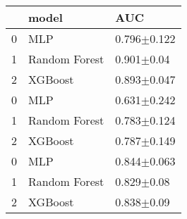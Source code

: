 \begin{tabular}{lll}
\toprule
 & model & AUC \\
\midrule
0 & MLP & 0.796$\pm$0.122 \\
1 & Random Forest & 0.901$\pm$0.04 \\
2 & XGBoost & 0.893$\pm$0.047 \\
0 & MLP & 0.631$\pm$0.242 \\
1 & Random Forest & 0.783$\pm$0.124 \\
2 & XGBoost & 0.787$\pm$0.149 \\
0 & MLP & 0.844$\pm$0.063 \\
1 & Random Forest & 0.829$\pm$0.08 \\
2 & XGBoost & 0.838$\pm$0.09 \\
\bottomrule
\end{tabular}
